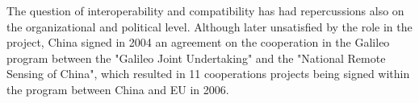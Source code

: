The question of interoperability and compatibility has had repercussions also on
the organizational and political level. Although later unsatisfied by the role
in the project, China signed in 2004 an agreement on the cooperation in the
Galileo program between the "Galileo Joint Undertaking" and the "National Remote
Sensing of China", which resulted in 11 cooperations projects being signed
within the program between China and EU in 2006.

